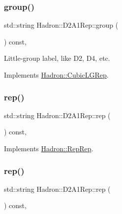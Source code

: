 \subsubsection{\texorpdfstring{group()}{group()}\hspace{0.1cm}{\footnotesize\ttfamily [3/3]}}
{\footnotesize\ttfamily std\+::string Hadron\+::\+D2\+A1\+Rep\+::group (\begin{DoxyParamCaption}{ }\end{DoxyParamCaption}) const\hspace{0.3cm}{\ttfamily [inline]}, {\ttfamily [virtual]}}

Little-\/group label, like D2, D4, etc. 

Implements \mbox{\hyperlink{structHadron_1_1CubicLGRep_a9bdb14b519a611d21379ed96a3a9eb41}{Hadron\+::\+Cubic\+L\+G\+Rep}}.

\mbox{\label{structHadron_1_1D2A1Rep_ad489cd29126b2c555a38bb2a5545b2b4}} 
\subsubsection{\texorpdfstring{rep()}{rep()}\hspace{0.1cm}{\footnotesize\ttfamily [1/3]}}
{\footnotesize\ttfamily std\+::string Hadron\+::\+D2\+A1\+Rep\+::rep (\begin{DoxyParamCaption}{ }\end{DoxyParamCaption}) const\hspace{0.3cm}{\ttfamily [inline]}, {\ttfamily [virtual]}}



Implements \mbox{\hyperlink{structHadron_1_1RepRep_ab3213025f6de249f7095892109575fde}{Hadron\+::\+Rep\+Rep}}.

\mbox{\label{structHadron_1_1D2A1Rep_ad489cd29126b2c555a38bb2a5545b2b4}} 
\subsubsection{\texorpdfstring{rep()}{rep()}\hspace{0.1cm}{\footnotesize\ttfamily [2/3]}}
{\footnotesize\ttfamily std\+::string Hadron\+::\+D2\+A1\+Rep\+::rep (\begin{DoxyParamCaption}{ }\end{DoxyParamCaption}) const\hspace{0.3cm}{\ttfamily [inline]}, {\ttfamily [virtual]}}



